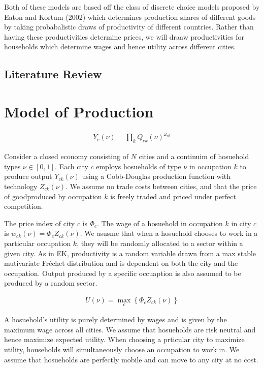 \documentclass[10pt]{article}
\begin{document}
Both of these models are based off the class of discrete choice models proposed by Eaton and Kortum (2002) which determines production shares of different goods by taking probabalistic draws of productivity of different countries. Rather than having these productivities determine prices, we will draaw productivities for households which determine wages and hence utility across different cities.

\subsection{Literature Review}

\section{Model of Production}

\begin{align}
    Y_{c} (\nu) = \prod_k Q_{ck} (\nu)^{\omega_{ck}}
\end{align}

Consider a closed economy consisting of $N$ cities and a continuim of hosuehold types $\nu \in [0, 1]$. Each city $c$ employs hosueholds of type $\nu$ in occupation $k$ to produce output $Y_{ck} (\nu)$ using a Cobb-Douglas production function with technology $Z_{ck} (\nu)$. We assume no trade costs between cities, and that the price of goodproduced by occupation $k$ is freely traded and priced under perfect competition.

The price index of city $c$ is $\Phi_c$. The wage of a hosuehold in occupation $k$ in city $c$ is $w_{ck} (\nu) = \Phi_c Z_{ck} (\nu)$. We asusme that when a hosuehold chooses to work in a particular occupation $k$, they will be randomly allocated to a sector within a given city. As in EK, productivity is a random variable drawn from a max stable mutivariate Fr\'{e}chet distribution and is dependent on both the city and the occupation. Output produced by a specific occuaption is also assumed to be produced by a random sector.

\begin{align}
    U (\nu) = \max_c \left\{ \Phi_c Z_{ck} (\nu) \right\}
\end{align}

A hosuehold's utility is purely determined by wages and is given by the maximum wage across all cities. We assume that hosueholds are risk neutral and hence maximize expected utility. When choosing a prticular city to maximize utility, households will simultaneously choose an occupation to work in. We assume that hosueholds are perfectly mobile and can move to any city at no cost.
\end{document}
